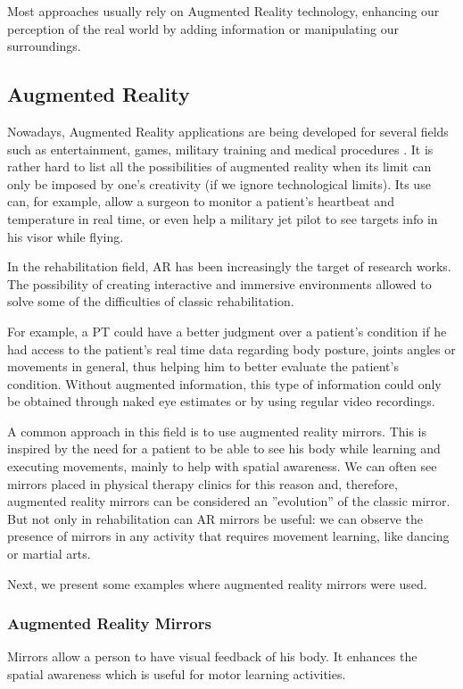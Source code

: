 \documentclass[runningheads]{llncs}
\begin{document}
Most approaches usually rely on Augmented Reality technology, enhancing our perception of the real world
by adding information or manipulating our surroundings.  

\subsection{Augmented Reality}
\label{RW-AR}

Nowadays, Augmented Reality applications 
are being developed for several fields such as entertainment, games, military training 
and medical procedures \cite{Guimaraes2014a, Rego2010}. 
It is rather hard to list all the possibilities of augmented reality when its limit can only be imposed by one's creativity (if we ignore technological limits).
Its use can, for example, allow a surgeon to monitor a patient's heartbeat 
and temperature in real time, or even help a military jet pilot to see targets info in his visor while flying.

In the rehabilitation field, \ac{AR} has been increasingly the target of research works.
The possibility of creating interactive and immersive environments
allowed to solve some of the difficulties of classic rehabilitation.

For example, a PT could have a better judgment over a patient's condition if he 
had access to the patient's real time data regarding body posture, joints angles or movements in general, thus helping him to better evaluate the patient's condition. 
Without augmented information, this type of information could only be obtained through naked eye 
estimates or by using regular video recordings.

A common approach in this field is to use augmented reality mirrors. 
This is inspired by the need for a patient to be able to see his body while
learning and executing movements, mainly to help with spatial awareness. We can often
see mirrors placed in physical therapy clinics for this reason and, therefore, 
augmented reality mirrors can be considered an ''evolution'' of the classic mirror.
But not only in rehabilitation can \ac{AR} mirrors be useful: we can observe 
the presence of mirrors in any activity that requires movement learning, like dancing or martial arts.

Next, we present some examples where augmented reality mirrors were used.



\subsubsection{Augmented Reality Mirrors}
\label{RW-mirrors}
Mirrors allow a person to have visual feedback of his body. It enhances the spatial awareness which is useful for motor learning activities.
\end{document}
